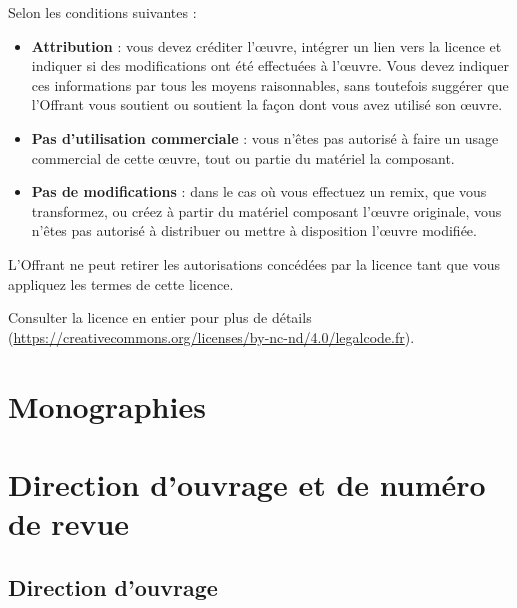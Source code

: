 \documentclass{article}
\begin{document}
\bigskip

    Selon les conditions suivantes :
    \begin{itemize}
        \item \textbf{Attribution} : vous devez créditer l'\oe{}uvre, intégrer un lien vers la licence et indiquer si des modifications ont été effectuées à l'\oe{}uvre. Vous devez indiquer ces informations par tous les moyens raisonnables, sans toutefois suggérer que l'Offrant vous soutient ou soutient la façon dont vous avez utilisé son \oe{}uvre.
        \item \textbf{Pas d'utilisation commerciale} : vous n'êtes pas autorisé à faire un usage commercial de cette \oe{}uvre, tout ou partie du matériel la composant. 
        \item \textbf{Pas de modifications} : dans le cas où vous effectuez un remix, que vous transformez, ou créez à partir du matériel composant l'\oe{}uvre originale, vous n'êtes pas autorisé à distribuer ou mettre à disposition l'\oe{}uvre modifiée. 
    \end{itemize}

\medskip

L'Offrant ne peut retirer les autorisations concédées par la licence tant que vous appliquez les termes de cette licence.

\medskip

    Consulter la licence en entier pour plus de détails (\url{https://creativecommons.org/licenses/by-nc-nd/4.0/legalcode.fr}). 

\newpage
\thispagestyle{empty}
\tableofcontents

\nocite{*}
\newpage

\section{Monographies}

\printbibliography[heading=subbibliography,keyword=monographie2020,heading=none]

\section{Direction d'ouvrage et de numéro de revue}

\subsection{Direction d'ouvrage}

\printbibliography[heading=subbibliography,keyword=dirouvrage2020,heading=none]
\end{document}
